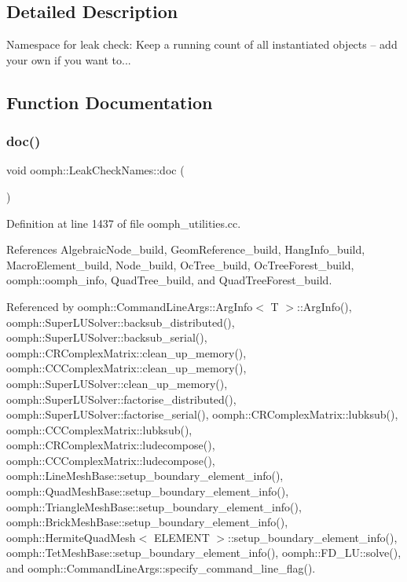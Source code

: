 \subsection{Detailed Description}
Namespace for leak check\+: Keep a running count of all instantiated objects -- add your own if you want to... 

\subsection{Function Documentation}
\mbox{\label{namespaceoomph_1_1LeakCheckNames_ad5ef7bca3a63e643b0eec22dd3bab58b}} 
\subsubsection{\texorpdfstring{doc()}{doc()}}
{\footnotesize\ttfamily void oomph\+::\+Leak\+Check\+Names\+::doc (\begin{DoxyParamCaption}{ }\end{DoxyParamCaption})}



Definition at line 1437 of file oomph\+\_\+utilities.\+cc.



References Algebraic\+Node\+\_\+build, Geom\+Reference\+\_\+build, Hang\+Info\+\_\+build, Macro\+Element\+\_\+build, Node\+\_\+build, Oc\+Tree\+\_\+build, Oc\+Tree\+Forest\+\_\+build, oomph\+::oomph\+\_\+info, Quad\+Tree\+\_\+build, and Quad\+Tree\+Forest\+\_\+build.



Referenced by oomph\+::\+Command\+Line\+Args\+::\+Arg\+Info$<$ T $>$\+::\+Arg\+Info(), oomph\+::\+Super\+L\+U\+Solver\+::backsub\+\_\+distributed(), oomph\+::\+Super\+L\+U\+Solver\+::backsub\+\_\+serial(), oomph\+::\+C\+R\+Complex\+Matrix\+::clean\+\_\+up\+\_\+memory(), oomph\+::\+C\+C\+Complex\+Matrix\+::clean\+\_\+up\+\_\+memory(), oomph\+::\+Super\+L\+U\+Solver\+::clean\+\_\+up\+\_\+memory(), oomph\+::\+Super\+L\+U\+Solver\+::factorise\+\_\+distributed(), oomph\+::\+Super\+L\+U\+Solver\+::factorise\+\_\+serial(), oomph\+::\+C\+R\+Complex\+Matrix\+::lubksub(), oomph\+::\+C\+C\+Complex\+Matrix\+::lubksub(), oomph\+::\+C\+R\+Complex\+Matrix\+::ludecompose(), oomph\+::\+C\+C\+Complex\+Matrix\+::ludecompose(), oomph\+::\+Line\+Mesh\+Base\+::setup\+\_\+boundary\+\_\+element\+\_\+info(), oomph\+::\+Quad\+Mesh\+Base\+::setup\+\_\+boundary\+\_\+element\+\_\+info(), oomph\+::\+Triangle\+Mesh\+Base\+::setup\+\_\+boundary\+\_\+element\+\_\+info(), oomph\+::\+Brick\+Mesh\+Base\+::setup\+\_\+boundary\+\_\+element\+\_\+info(), oomph\+::\+Hermite\+Quad\+Mesh$<$ E\+L\+E\+M\+E\+N\+T $>$\+::setup\+\_\+boundary\+\_\+element\+\_\+info(), oomph\+::\+Tet\+Mesh\+Base\+::setup\+\_\+boundary\+\_\+element\+\_\+info(), oomph\+::\+F\+D\+\_\+\+L\+U\+::solve(), and oomph\+::\+Command\+Line\+Args\+::specify\+\_\+command\+\_\+line\+\_\+flag().

